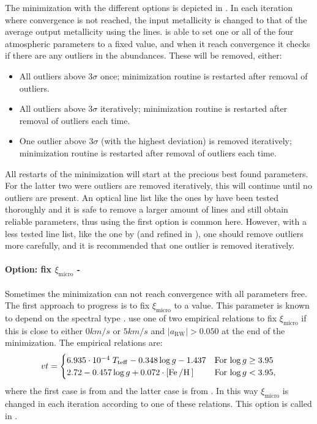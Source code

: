The minimization with the different options is depicted in . In each
iteration where convergence is not reached, the input metallicity is changed to that of the average
output metallicity using the  lines.  is able to set one or all of the four
atmospheric parameters to a fixed value, and when it reach convergence it checks if there are any
outliers in the abundances. These will be removed, either:
\begin{itemize}
  \item All outliers above $3\sigma$ once; minimization routine is restarted after removal of
        outliers.
  \item All outliers above $3\sigma$ iteratively; minimization routine is restarted after removal of
        outliers each time.
  \item One outlier above $3\sigma$ (with the highest deviation) is removed iteratively;
        minimization routine is restarted after removal of outliers each time.
\end{itemize}

All restarts of the minimization will start at the precious best found parameters. For the latter
two were outliers are removed iteratively, this will continue until no outliers are present. An
optical line list like the ones by \citet{Sousa2008a,Tsantaki2013} have been tested thoroughly and
it is safe to remove a larger amount of lines and still obtain reliable parameters, thus using the
first option is common here. However, with a less tested line list, like the one by
\citet{Andreasen2016} (and refined in \citet{Andreasen2017b}), one should remove outliers more
carefully, and it is recommended that one outlier is removed iteratively.

\paragraph{Option: fix $\xi_\mathrm{micro}$ - }

Sometimes the minimization can not reach convergence with all parameters free. The first approach to
progress is to fix $\xi_\mathrm{micro}$ to a value. This parameter is known to depend on the
spectral type \citep[see e.g.][and references therein]{Tsantaki2013}.  use one of two
empirical relations to fix $\xi_\mathrm{micro}$ if this is close to either $0\si{km/s}$ or
$5\si{km/s}$ and $|a_\mathrm{RW}| > 0.050$ at the end of the minimization. The empirical relations
are:
\begin{align}
  vt =
  \begin{cases}
    6.935 \cdot 10^{-4}\; T_\mathrm{teff} - 0.348 \log g - 1.437     & \text{For $\log g \ge 3.95$} \\
    2.72 - 0.457 \log g + 0.072 \cdot [\ion{Fe}/\ion{H}]             & \text{For $\log g < 3.95$},
  \end{cases}
\end{align}
where the first case is from \citet{Tsantaki2013} and the latter case is from \citet{Adibekyan2015}.
In this way $\xi_\mathrm{micro}$ is changed in each iteration according to one of these relations.
This option is called  in .

